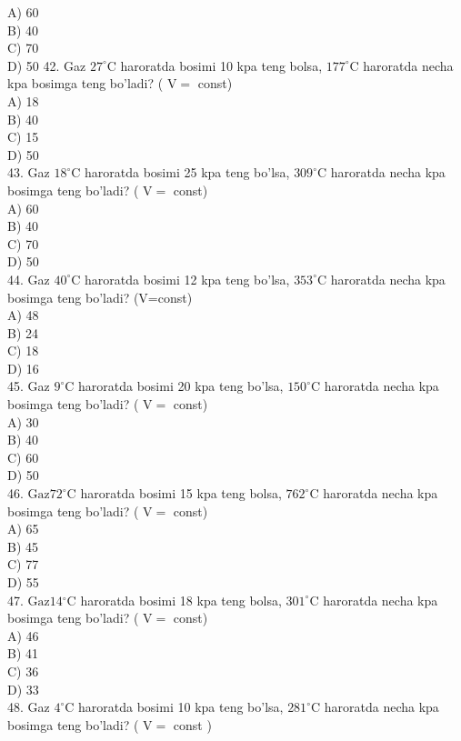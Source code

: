 A) 60\\
B) 40\\
C) 70\\
D) 50
42. Gaz $27^{\circ} \mathrm{C}$ haroratda bosimi 10 kpa teng bolsa, $177^{\circ} \mathrm{C}$ haroratda necha kpa bosimga teng bo'ladi? ( $\mathrm{V}=$ const)\\
A) 18\\
B) 40\\
C) 15\\
D) 50\\
43. Gaz $18^{\circ} \mathrm{C}$ haroratda bosimi 25 kpa teng bo'lsa, $309^{\circ} \mathrm{C}$ haroratda necha kpa bosimga teng bo'ladi? ( $\mathrm{V}=$ const)\\
A) 60\\
B) 40\\
C) 70\\
D) 50\\
44. Gaz $40^{\circ} \mathrm{C}$ haroratda bosimi 12 kpa teng bo'lsa, $353^{\circ} \mathrm{C}$ haroratda necha kpa bosimga teng bo'ladi? (V=const)\\
A) 48\\
B) 24\\
C) 18\\
D) 16\\
45. Gaz $9^{\circ} \mathrm{C}$ haroratda bosimi 20 kpa teng bo'lsa, $150^{\circ} \mathrm{C}$ haroratda necha kpa bosimga teng bo'ladi? ( $\mathrm{V}=$ const)\\
A) 30\\
B) 40\\
C) 60\\
D) 50\\
46. $\mathrm{Gaz} 72^{\circ} \mathrm{C}$ haroratda bosimi 15 kpa teng bolsa, $762^{\circ} \mathrm{C}$ haroratda necha kpa bosimga teng bo'ladi? ( $\mathrm{V}=$ const)\\
A) 65\\
B) 45\\
C) 77\\
D) 55\\
47. $\mathrm{Gaz} 14{ }^{\circ} \mathrm{C}$ haroratda bosimi 18 kpa teng bolsa, $301^{\circ} \mathrm{C}$ haroratda necha kpa bosimga teng bo'ladi? ( $\mathrm{V}=$ const)\\
A) 46\\
B) 41\\
C) 36\\
D) 33\\
48. Gaz $4^{\circ} \mathrm{C}$ haroratda bosimi 10 kpa teng bo'lsa, $281^{\circ} \mathrm{C}$ haroratda necha kpa bosimga teng bo'ladi? ( $\mathrm{V}=$ const )\\
